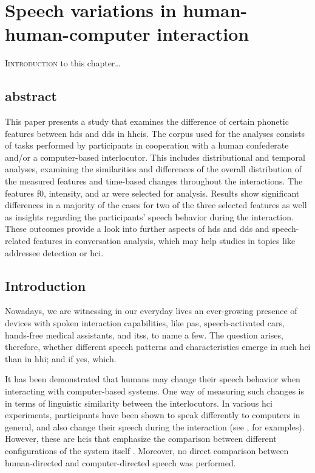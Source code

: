 \chapter{Speech variations in human-human-computer interaction}
\label{chap:speech_variations_in_hhci}

\lettrine{I}{introduction} to this chapter\ldots

\pagebreak


\section{abstract}

This paper presents a study that examines the difference of certain phonetic features between \acf{hds} and \acf{dds} in \acfp{hhci}.
The corpus used for the analyses consists of tasks performed by participants in cooperation with a human confederate and/or a computer-based interlocutor.
This includes distributional and temporal analyses, examining the similarities and differences of the overall distribution of the measured features and time-based changes throughout the interactions. 
The features \acl{f0}, intensity, and \acl{ar} were selected for analysis.
Results show significant differences in a majority of the cases for two of the three selected features as well as insights regarding the participants' speech behavior during the interaction.
These outcomes provide a look into further aspects of \ac{hds} and \ac{dds} and speech-related features in conversation analysis, which may help studies in topics like addressee detection or \ac{hci}.

\section{Introduction}
\label{sec:introduction}

Nowadays, we are witnessing in our everyday lives an ever-growing presence of devices with spoken interaction capabilities, like \acp{pa}, speech-activated cars, hands-free medical assistants, and \acp{its}, to name a few.
The question arises, therefore, whether different speech patterns and characteristics emerge in such \ac{hci} than in \ac{hhi}; and if yes, which.

It has been demonstrated that humans may change their speech behavior when interacting with computer-based systems.
One way of measuring such changes is in terms of linguistic similarity between the interlocutors.
In various \ac{hci} experiments, participants have been shown to speak differently to computers in general, and also change their speech during the interaction (see \citet{Branigan2010linguistic}, for examples).
However, these are \acp{hci}  that emphasize the comparison between different configurations of the system itself \citep[e.g.,][]{Levitan2016implementing}.
Moreover, no direct comparison between human-directed and computer-directed speech was performed.

